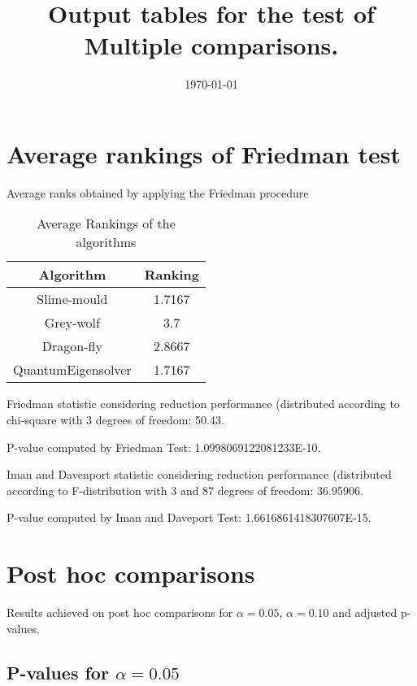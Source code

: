 \documentclass[a4paper,10pt]{article}
\title{Output tables for the test of Multiple comparisons.}
\author{}
\date{\today}
\begin{document}
\begin{landscape}
\pagestyle{empty}
\maketitle
\thispagestyle{empty}
\section{Average rankings of Friedman test}



Average ranks obtained by applying the Friedman procedure

\begin{table}[!htp]
\centering
\begin{tabular}{|c|c|}\hline
Algorithm&Ranking\\\hline
Slime-mould & 1.7167\\
Grey-wolf & 3.7\\
Dragon-fly & 2.8667\\
QuantumEigensolver & 1.7167\\
\hline
\end{tabular}
\caption{Average Rankings of the algorithms}
\end{table}

Friedman statistic considering reduction performance (distributed according to chi-square with 3 degrees of freedom: 50.43.

P-value computed by Friedman Test: 1.0998069122081233E-10.\newline

Iman and Davenport statistic considering reduction performance (distributed according to F-distribution with 3 and 87 degrees of freedom: 36.95906.

P-value computed by Iman and Daveport Test: 1.6616861418307607E-15.\newline



\pagebreak

\section{Post hoc comparisons}

Results achieved on post hoc comparisons for $\alpha = 0.05$, $\alpha = 0.10$ and adjusted p-values.

\subsection{P-values for $\alpha=0.05$}


\end{landscape}
\end{document}
